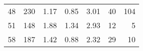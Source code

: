 \begin{tabular}{rrrrrrr}
48 &      230 &                             1.17 &                             0.85 &                             3.01 &              40 &             104 \\
51 &      148 &                             1.88 &                             1.34 &                             2.93 &              12 &               5 \\
58 &      187 &                             1.42 &                             0.88 &                             2.32 &              29 &              10 \\
\bottomrule
\end{tabular}
